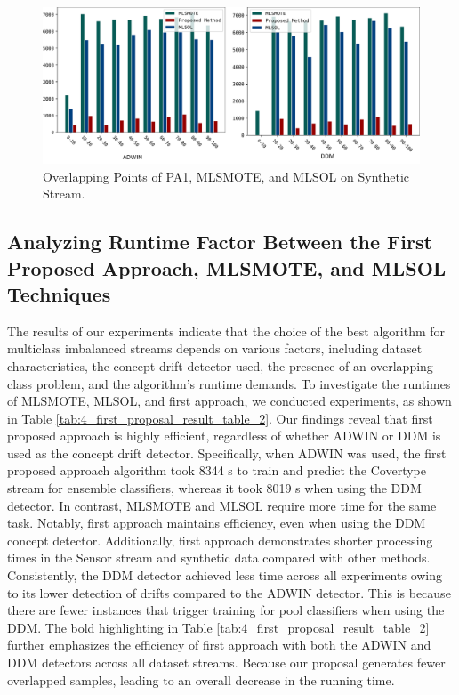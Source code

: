 \begin{figure}[!ht]
	\centering
	\includegraphics[width=1\linewidth]{4_Imbalanced/figures/exp_9.png}
  \caption{Overlapping Points of PA1, MLSMOTE, and MLSOL on Synthetic Stream.}
	\label{fig:4_first_proposal_result_exp_9}
\end{figure}

\subsection{Analyzing Runtime Factor Between the First Proposed Approach, MLSMOTE, and MLSOL Techniques}
The results of our experiments indicate that the choice of the best algorithm for multiclass imbalanced streams depends on various factors, including dataset characteristics, the concept drift detector used, the presence of an overlapping class problem, and the algorithm's runtime demands. To investigate the runtimes of MLSMOTE, MLSOL, and first approach, we conducted experiments, as shown in Table \ref{tab:4_first_proposal_result_table_2}. Our findings reveal that first proposed approach is highly efficient, regardless of whether ADWIN or DDM is used as the concept drift detector. Specifically, when ADWIN was used, the first proposed approach algorithm took 8344 s to train and predict the Covertype stream for ensemble classifiers, whereas it took 8019 s when using the DDM detector. In contrast, MLSMOTE and MLSOL require more time for the same task. Notably, first approach maintains efficiency, even when using the DDM concept detector. Additionally, first approach demonstrates shorter processing times in the Sensor stream and synthetic data compared with other methods. Consistently, the DDM detector achieved less time across all experiments owing to its lower detection of drifts compared to the ADWIN detector. This is because there are fewer instances that trigger training for pool classifiers when using the DDM. The bold highlighting in Table \ref{tab:4_first_proposal_result_table_2} further emphasizes the efficiency of first approach with both the ADWIN and DDM detectors across all dataset streams. Because our proposal generates fewer overlapped samples, leading to an overall decrease in the running time.

